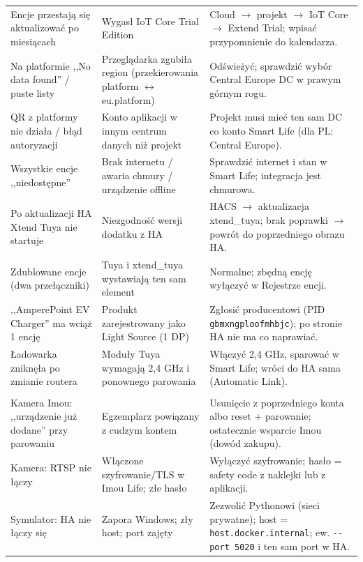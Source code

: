 \documentclass[11pt,a4paper]{article}
\begin{document}
\begin{longtable}{>{\raggedright\arraybackslash}p{4.2cm} >{\raggedright\arraybackslash}p{4.6cm} >{\raggedright\arraybackslash}p{5.6cm}}
\addlinespace
Encje przestają się aktualizować po miesiącach & Wygasł IoT Core Trial Edition & Cloud $\to$ projekt $\to$ IoT Core $\to$ Extend Trial; wpisać przypomnienie do kalendarza.\\
\addlinespace
Na platformie ,,No data found'' / puste listy & Przeglądarka zgubiła region (przekierowania platform $\leftrightarrow$ eu.platform) & Odświeżyć; sprawdzić wybór Central Europe DC w prawym górnym rogu.\\
\addlinespace
QR z platformy nie działa / błąd autoryzacji & Konto aplikacji w innym centrum danych niż projekt & Projekt musi mieć ten sam DC co konto Smart Life (dla PL: Central Europe).\\
\addlinespace
Wszystkie encje ,,niedostępne'' & Brak internetu / awaria chmury / urządzenie offline & Sprawdzić internet i stan w Smart Life; integracja jest chmurowa.\\
\addlinespace
Po aktualizacji HA Xtend Tuya nie startuje & Niezgodność wersji dodatku z HA & HACS $\to$ aktualizacja xtend\_tuya; brak poprawki $\to$ powrót do poprzedniego obrazu HA.\\
\addlinespace
Zdublowane encje (dwa przełączniki) & Tuya i xtend\_tuya wystawiają ten sam element & Normalne; zbędną encję wyłączyć w Rejestrze encji.\\
\addlinespace
,,AmperePoint EV Charger'' ma wciąż 1 encję & Produkt zarejestrowany jako Light Source (1 DP) & Zgłosić producentowi (PID \texttt{gbmxngploofmhbjc}); po stronie HA nie ma co naprawiać.\\
\addlinespace
Ładowarka zniknęła po zmianie routera & Moduły Tuya wymagają 2,4 GHz i ponownego parowania & Włączyć 2,4 GHz, sparować w Smart Life; wróci do HA sama (Automatic Link).\\
\addlinespace
\multicolumn{3}{l}{\textit{--- Rozszerzenia ---}}\\
\addlinespace
Kamera Imou: ,,urządzenie już dodane'' przy parowaniu & Egzemplarz powiązany z cudzym kontem & Usunięcie z poprzedniego konta albo reset + parowanie; ostatecznie wsparcie Imou (dowód zakupu).\\
\addlinespace
Kamera: RTSP nie łączy & Włączone szyfrowanie/TLS w Imou Life; złe hasło & Wyłączyć szyfrowanie; hasło = safety code z naklejki lub z aplikacji.\\
\addlinespace
Symulator: HA nie łączy się & Zapora Windows; zły host; port zajęty & Zezwolić Pythonowi (sieci prywatne); host = \texttt{host.docker.internal}; ew. \texttt{-{}-port 5020} i ten sam port w HA.\\
\bottomrule
\end{longtable}
\end{document}
